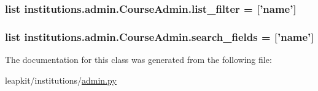 \hypertarget{classinstitutions_1_1admin_1_1_course_admin_aaa38c59ff54a7472196d5fbdc360bcf1}{
\subsubsection[{list\-\_\-filter}]{\setlength{\rightskip}{0pt plus 5cm}list institutions.\-admin.\-Course\-Admin.\-list\-\_\-filter = \mbox{[}'name'\mbox{]}\hspace{0.3cm}{\ttfamily [static]}}}\label{classinstitutions_1_1admin_1_1_course_admin_aaa38c59ff54a7472196d5fbdc360bcf1}
\hypertarget{classinstitutions_1_1admin_1_1_course_admin_a8a24f7aeef7ef599ba4e44f2d91232ff}{
\subsubsection[{search\-\_\-fields}]{\setlength{\rightskip}{0pt plus 5cm}list institutions.\-admin.\-Course\-Admin.\-search\-\_\-fields = \mbox{[}'name'\mbox{]}\hspace{0.3cm}{\ttfamily [static]}}}\label{classinstitutions_1_1admin_1_1_course_admin_a8a24f7aeef7ef599ba4e44f2d91232ff}


The documentation for this class was generated from the following file\-:\begin{DoxyCompactItemize}
\item 
leapkit/institutions/\hyperlink{institutions_2admin_8py}{admin.\-py}\end{DoxyCompactItemize}
